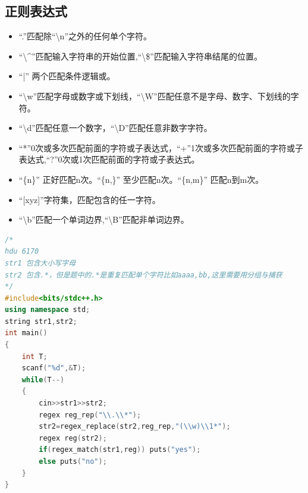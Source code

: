 \documentclass[UTF8,a4paper,titlepage]{ctexart}
\begin{document}
\subsection{正则表达式}
\begin{itemize}
\item ``.''匹配除``\textbackslash n''之外的任何单个字符。
\item ``\textbackslash \^\quad ''匹配输入字符串的开始位置,``\textbackslash \$''匹配输入字符串结尾的位置。
\item ``|'' 两个匹配条件逻辑或。
\item ``\textbackslash w''匹配字母或数字或下划线，``\textbackslash W''匹配任意不是字母、数字、下划线的字符。
\item ``\textbackslash d''匹配任意一个数字，``\textbackslash D''匹配任意非数字字符。

\item ``*''0次或多次匹配前面的字符或子表达式，``+''1次或多次匹配前面的字符或子表达式,``?''0次或1次匹配前面的字符或子表达式。
\item ``\{n\}'' 正好匹配n次。``\{n,\}'' 至少匹配n次。``\{n,m\}'' 匹配n到m次。
\item ``[xyz]''字符集，匹配包含的任一字符。
\item ``\textbackslash b''匹配一个单词边界,``\textbackslash B''匹配非单词边界。
\end{itemize}

\begin{lstlisting}[language=C++]
/*
hdu 6170
str1 包含大小写字母
str2 包含.*，但是题中的.*是重复匹配单个字符比如aaaa,bb,这里需要用分组与捕获
*/
#include<bits/stdc++.h>
using namespace std;
string str1,str2;
int main()
{
    int T;
    scanf("%d",&T);
    while(T--)
    {
        cin>>str1>>str2;
        regex reg_rep("\\.\\*");
        str2=regex_replace(str2,reg_rep,"(\\w)\\1*");
        regex reg(str2);
        if(regex_match(str1,reg)) puts("yes");
        else puts("no");
    }
}

\end{lstlisting}
\end{document}
